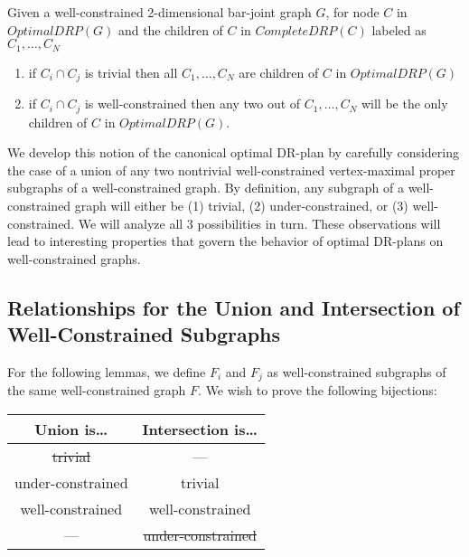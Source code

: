 \begin{theorem}\label{t1}
Given a well-constrained 2-dimensional bar-joint graph $G$, for node $C$ in $OptimalDRP(G)$ and the children of $C$ in $CompleteDRP(C)$ labeled as $C_1,\ldots,C_N$
\begin{enumerate}
    \item if $C_i \cap C_j$ is trivial then all $C_1,\ldots,C_N$ are children of $C$ in $OptimalDRP(G)$
    \item if $C_i \cap C_j$ is well-constrained then any two out of $C_1,\ldots,C_N$ will be the only children of $C$ in $OptimalDRP(G)$.
\end{enumerate}
\end{theorem}

We develop this notion of the canonical optimal DR-plan by carefully considering the case of a union of any two nontrivial well-constrained vertex-maximal proper subgraphs of a well-constrained graph. By definition, any subgraph of a well-constrained graph will either be (1) trivial, (2) under-constrained, or (3) well-constrained. We will analyze all 3 possibilities in turn. These observations will lead to interesting properties that govern the behavior of optimal DR-plans on well-constrained graphs.






\subsection{Relationships for the Union and Intersection of Well-Constrained Subgraphs}
For the following lemmas, we define $F_i$ and $F_j$ as well-constrained subgraphs of the same well-constrained graph $F$.
We wish to prove the following bijections:

\begin{center}
\begin{tabular}{|c|c|}
\hline
\textbf{Union is\ldots} & \textbf{Intersection is\ldots} \\ \hline
\sout{trivial}          & --- \\ \hline
under-constrained       & trivial \\ \hline
well-constrained        & well-constrained \\ \hline
---                     & \sout{under-constrained} \\ \hline
\end{tabular}
\end{center}


